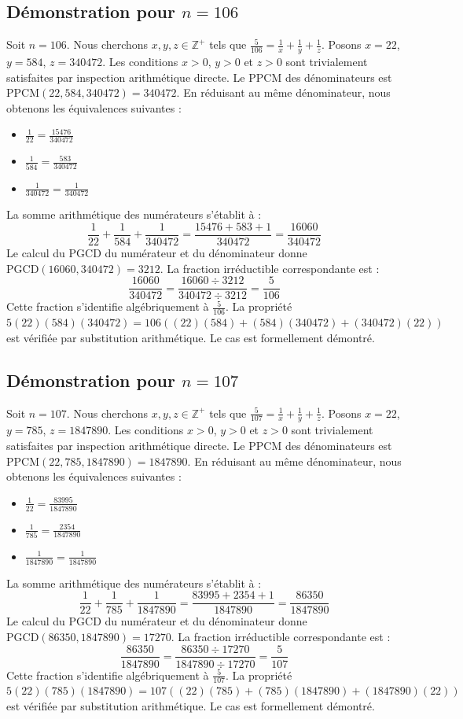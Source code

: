 \documentclass[12pt,a4paper]{article}
\begin{document}
\subsection{Démonstration pour $n = 106$}
Soit $n = 106$. Nous cherchons $x, y, z \in \mathbb{Z}^{+}$ tels que $\frac{5}{106} = \frac{1}{x} + \frac{1}{y} + \frac{1}{z}$.
Posons $x = 22$, $y = 584$, $z = 340472$.
Les conditions $x > 0$, $y > 0$ et $z > 0$ sont trivialement satisfaites par inspection arithmétique directe.
Le PPCM des dénominateurs est $\text{PPCM}(22, 584, 340472) = 340472$.
En réduisant au même dénominateur, nous obtenons les équivalences suivantes :
\begin{itemize}
    \item $\frac{1}{22} = \frac{15476}{340472}$
    \item $\frac{1}{584} = \frac{583}{340472}$
    \item $\frac{1}{340472} = \frac{1}{340472}$
\end{itemize}
La somme arithmétique des numérateurs s'établit à :
$$ \frac{1}{22} + \frac{1}{584} + \frac{1}{340472} = \frac{15476 + 583 + 1}{340472} = \frac{16060}{340472} $$
Le calcul du PGCD du numérateur et du dénominateur donne $\text{PGCD}(16060, 340472) = 3212$.
La fraction irréductible correspondante est :
$$ \frac{16060}{340472} = \frac{16060 \div 3212}{340472 \div 3212} = \frac{5}{106} $$
Cette fraction s'identifie algébriquement à $\frac{5}{106}$.
La propriété $5(22)(584)(340472) = 106((22)(584) + (584)(340472) + (340472)(22))$ est vérifiée par substitution arithmétique.
Le cas est formellement démontré.

\subsection{Démonstration pour $n = 107$}
Soit $n = 107$. Nous cherchons $x, y, z \in \mathbb{Z}^{+}$ tels que $\frac{5}{107} = \frac{1}{x} + \frac{1}{y} + \frac{1}{z}$.
Posons $x = 22$, $y = 785$, $z = 1847890$.
Les conditions $x > 0$, $y > 0$ et $z > 0$ sont trivialement satisfaites par inspection arithmétique directe.
Le PPCM des dénominateurs est $\text{PPCM}(22, 785, 1847890) = 1847890$.
En réduisant au même dénominateur, nous obtenons les équivalences suivantes :
\begin{itemize}
    \item $\frac{1}{22} = \frac{83995}{1847890}$
    \item $\frac{1}{785} = \frac{2354}{1847890}$
    \item $\frac{1}{1847890} = \frac{1}{1847890}$
\end{itemize}
La somme arithmétique des numérateurs s'établit à :
$$ \frac{1}{22} + \frac{1}{785} + \frac{1}{1847890} = \frac{83995 + 2354 + 1}{1847890} = \frac{86350}{1847890} $$
Le calcul du PGCD du numérateur et du dénominateur donne $\text{PGCD}(86350, 1847890) = 17270$.
La fraction irréductible correspondante est :
$$ \frac{86350}{1847890} = \frac{86350 \div 17270}{1847890 \div 17270} = \frac{5}{107} $$
Cette fraction s'identifie algébriquement à $\frac{5}{107}$.
La propriété $5(22)(785)(1847890) = 107((22)(785) + (785)(1847890) + (1847890)(22))$ est vérifiée par substitution arithmétique.
Le cas est formellement démontré.
\end{document}
